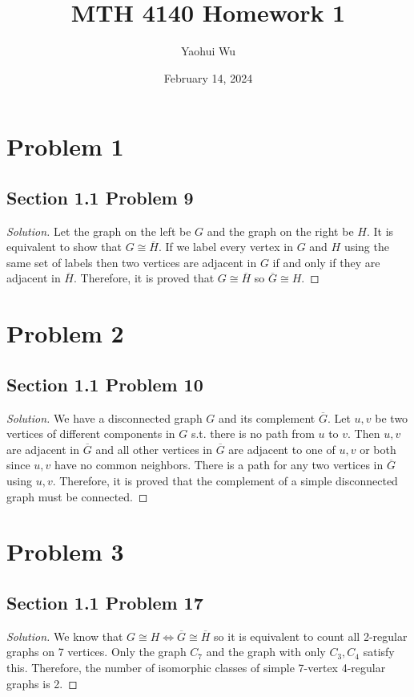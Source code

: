 \documentclass[12pt, letterpaper]{article}
\title{MTH 4140 Homework 1}
\author{Yaohui Wu}
\date{February 14, 2024}
\newenvironment{solution}{\begin{proof}[Solution]}{\end{proof}}
\begin{document}
\maketitle
\section*{Problem 1}
\subsection*{Section 1.1 Problem 9}
\begin{solution}
    Let the graph on the left be \(G\) and the graph on the right be \(H\). It
    is equivalent to show that \(G\cong\overline{H}\). If we label every vertex
    in \(G\) and \(H\) using the same set of labels then two vertices are
    adjacent in \(G\) if and only if they are adjacent in \(\overline{H}\).
    Therefore, it is proved that \(G\cong\overline{H}\) so \(\overline{G}\cong H\).
\end{solution}

\section*{Problem 2}
\subsection*{Section 1.1 Problem 10}
\begin{solution}
    We have a disconnected graph \(G\) and its complement \(\overline{G}\). Let
    \(u, v\) be two vertices of different components in \(G\) s.t. there is no
    path from \(u\) to \(v\). Then \(u, v\) are adjacent in \(\overline{G}\) and
    all other vertices in \(\overline{G}\) are adjacent to one of \(u, v\) or
    both since \(u, v\) have no common neighbors. There is a path for any two
    vertices in \(\overline{G}\) using \(u,v\). Therefore, it is proved that the
    complement of a simple disconnected graph must be connected.
\end{solution}

\section*{Problem 3}
\subsection*{Section 1.1 Problem 17}
\begin{solution}
    We know that \(G\cong H\iff\overline{G}\cong\overline{H}\) so it is
    equivalent to count all 2-regular graphs on 7 vertices. Only the graph
    \(C_7\) and the graph with only \(C_3,C_4\) satisfy this. Therefore, the
    number of isomorphic classes of simple 7-vertex 4-regular graphs is 2.
\end{solution}
\end{document}
